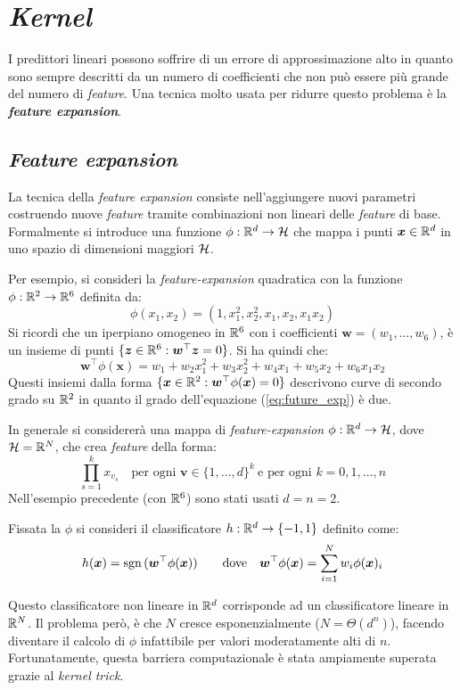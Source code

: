 \section{\textit{Kernel}}

I predittori lineari possono soffrire di un errore di approssimazione alto in
quanto sono sempre descritti da un numero di coefficienti che non può essere
più grande del numero di \textit{feature}. Una tecnica molto usata per ridurre
questo problema è la \textbf{\textit{feature expansion}}.

\subsection{\textit{Feature expansion}}
La tecnica della \textit{feature expansion} consiste nell'aggiungere nuovi
parametri costruendo nuove \textit{feature} tramite combinazioni non lineari
delle \textit{feature} di base. Formalmente si introduce una funzione
$\phi :\mathbb{R}^d\rightarrow \mathcal{H}$ che mappa i punti $\bm{x}\in\mathbb{R}^d$ in uno spazio
di dimensioni maggiori $\mathcal{H}$.

Per esempio, si consideri la \textit{feature-expansion} quadratica con la 
funzione $\phi:\mathbb{R}^2\rightarrow\mathbb{R}^6$ definita da:
$$ \phi(x_1,x_2)=(1,x_1^2,x_2^2,x_1,x_2,x_1x_2) $$
Si ricordi che un iperpiano omogeneo in $\mathbb{R}^6$ con i coefficienti
$\bm{w}=(w_1,\dots,w_6)$, è un insieme di punti 
$\{\bm{z}\in\mathbb{R}^6:\bm{w}^\top\bm{z}=0\}$. Si ha
quindi che:
\begin{equation}\label{eq:future_exp}
    \bm{w}^\top\phi(\bm{x}) = w_1+w_2x_1^2+w_3x_2^2+w_4x_1+w_5x_2+w_6x_1x_2
\end{equation}
Questi insiemi dalla forma $\{\bm{x}\in\mathbb{R}^2:\bm{w}^\top\phi(\bm{x}) = 0\}$
descrivono curve di secondo grado su $\mathbb{R}^2$ in quanto il grado dell'equazione
(\ref{eq:future_exp}) è due.

In generale si considererà una mappa di \textit{feature-expansion}
$\phi :\mathbb{R}^d\rightarrow \mathcal{H}$, dove $\mathcal{H}=\mathbb{R}^N$, che crea \textit{feature}
della forma:
$$\prod_{s=1}^k x_{v_s} \quad \text{per ogni \ } \bm{v}\in\{1,\dots,d\}^k \
\text{e per ogni \ } k=0,1,\dots,n$$
Nell'esempio precedente (con $\mathbb{R}^6$) sono stati usati $d=n=2$.

Fissata la $\phi$ si consideri il classificatore $h:\mathbb{R}^d\rightarrow\{-1,1\}$
definito come:
$$ h(\bm{x}) = \operatorname*{sgn}{(\bm{w}^\top\phi(\bm{x}))} \qquad \text{dove} 
\quad \bm{w}^\top\phi(\bm{x})=\sum_{i=1}^{N}w_i\phi(\bm{x})_i$$

Questo classificatore non lineare in $\mathbb{R}^d$ corrisponde ad un classificatore
lineare in $\mathbb{R}^N$. Il problema però, è che $N$ cresce esponenzialmente
($N=\Theta(d^n)$), facendo diventare il calcolo di $\phi$ infattibile per
valori moderatamente alti di $n$. Fortunatamente, questa barriera
computazionale è stata ampiamente superata grazie al \textit{kernel trick}.

